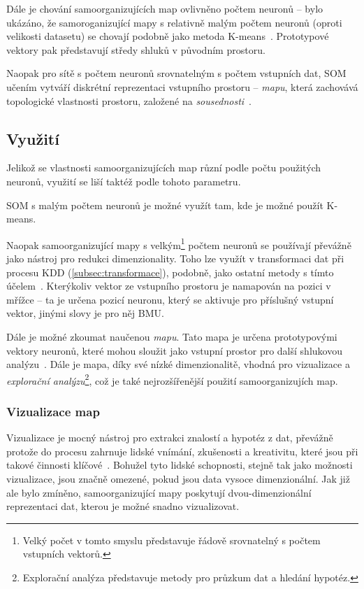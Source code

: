 \documentclass[thesis=M,czech]{FITthesis}[2012/06/26]
\begin{document}
Dále je chování samoorganizujících map ovlivněno počtem neuronů -- bylo ukázáno, že samoroganizující mapy s relativně malým počtem neuronů (oproti velikosti datasetu) se chovají podobně jako metoda K-means~\cite{somsub}. Prototypové vektory pak  představují středy shluků v původním prostoru.

Naopak pro sítě s počtem neuronů srovnatelným s počtem vstupních dat, SOM učením vytváří diskrétní reprezentaci vstupního prostoru -- \textit{mapu}, která zachovává topologické vlastnosti prostoru, založené na \textit{sousednosti}~\cite{cluster_som}.




\subsection{Využití}

Jelikož se vlastnosti samoorganizujících map různí podle počtu použitých neuronů, využití se liší taktéž podle tohoto parametru.

SOM s malým počtem neuronů je možné využít tam, kde je možné použít K-means.~\cite{somsub}


Naopak samoorganizující mapy s velkým\footnote{Velký počet v tomto smyslu představuje řádově srovnatelný s počtem vstupních vektorů.} počtem neuronů se používají převážně jako nástroj pro redukci dimenzionality.  Toho lze využít v transformaci dat při procesu KDD (\ref{subsec:transformace}), podobně, jako ostatní metody s tímto účelem~\cite{som_dim_red}. Kterýkoliv vektor ze vstupního prostoru je namapován na pozici v mřížce -- ta je určena pozicí neuronu, který se aktivuje pro příslušný vstupní vektor, jinými slovy je pro něj BMU.


Dále je možné zkoumat naučenou \textit{mapu}. Tato mapa je určena prototypovými vektory neuronů, které mohou sloužit jako vstupní prostor pro další shlukovou analýzu~\cite{som_clustering}. Dále je mapa, díky své nízké dimenzionalitě, vhodná pro vizualizace a 
\textit{explorační analýzu}\footnote{Explorační analýza představuje metody pro průzkum dat a hledání hypotéz.}, což je také nejrozšířenější použití samoorganizujích map.



\subsubsection*{Vizualizace map}
Vizualizace je mocný nástroj pro extrakci znalostí a hypotéz z dat, převážně protože do procesu zahrnuje lidské vnímání, zkušenosti a kreativitu, které jsou při takové činnosti klíčové~\cite{visual}. Bohužel tyto lidské schopnosti, stejně tak jako možnosti vizualizace, jsou značně omezené, pokud jsou data vysoce dimenzionální. Jak již ale bylo zmíněno, samoorganizující mapy poskytují dvou-dimenzionální reprezentaci dat, kterou je možné snadno vizualizovat.
\end{document}
